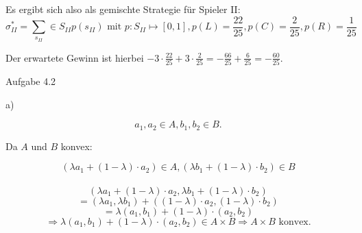 \documentclass{scrartcl}
\begin{document}
Es ergibt sich also als gemischte Strategie für Spieler II:
\[
\sigma^*_{II} = \sum_{s_{II}} \in S_{II} p(s_{II}) \text{ mit } p : S_{II} \mapsto [0, 1], p(L) = 
\frac{22}{25}, p(C) = \frac{2}{25}, p(R) = \frac{1}{25}
\]

Der erwartete Gewinn ist hierbei $-3 \cdot \frac{22}{25} + 3 \cdot \frac{2}{25} = -
\frac{66}{25} + \frac{6}{25} = -\frac{60}{25}$. \\

\begin{Large}
Aufgabe 4.2\\[0.0cm]
\end{Large}

a)

\[
a_1, a_2 \in A, b_1, b_2 \in B.
\]

Da $A$ und $B$ konvex:

\[
(\lambda a_1 + (1 - \lambda) \cdot a_2) \in A, (\lambda b_1 + (1 - \lambda) \cdot b_2) \in B
\]
\\
\[
(\lambda a_1 + (1 - \lambda) \cdot a_2, \lambda b_1 + (1 - \lambda) \cdot b_2)
\]
\[
= (\lambda a_1, \lambda b_1) + ((1 - \lambda) \cdot a_2, (1 - \lambda) \cdot b_2)
\]
\[
= \lambda(a_1, b_1) + (1 - \lambda) \cdot (a_2, b_2)
\]
\[
\Rightarrow \lambda(a_1, b_1) + (1 - \lambda) \cdot (a_2, b_2) \in A \times B \Rightarrow A \times
B \text{ konvex.}
\]
\end{document}
